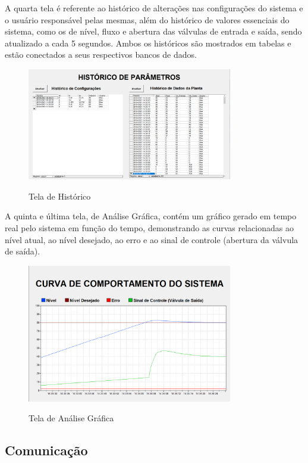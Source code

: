 \documentclass[
	article,			%
	11pt,				%
	oneside,			%
	a4paper,			%
	section=TITLE,		%
	english,			%
	brazil,				%
	sumario=tradicional
	]{abntex2}
\newcommand{\factorio}{\textit{Factory.io}}%
\begin{document}
A quarta tela é referente ao histórico de alterações nas configurações do sistema e o usuário responsável pelas mesmas, além do histórico de valores essenciais do sistema, como os de nível, fluxo e abertura das válvulas de entrada e saída, sendo atualizado a cada 5 segundos. Ambos os históricos são mostrados em tabelas e estão conectados a seus respectivos bancos de dados.

\begin{figure}[H]
    \centering
    \caption{Tela de Histórico} \includegraphics[width=0.8\textwidth]{img/ui_hist.png}
    \label{fig:ui_hist}
\end{figure}

A quinta e última tela, de Análise Gráfica, contém um gráfico gerado em tempo real pelo sistema em função do tempo, demonstrando as curvas relacionadas ao nível atual, ao nível desejado, ao erro e ao sinal de controle (abertura da válvula de saída).

\begin{figure}[H]
    \centering
    \caption{Tela de Análise Gráfica} \includegraphics[width=0.8\textwidth]{img/ui_graph.png}
    \label{fig:analise_grafica}
\end{figure}

\subsection{Comunicação}
\end{document}
